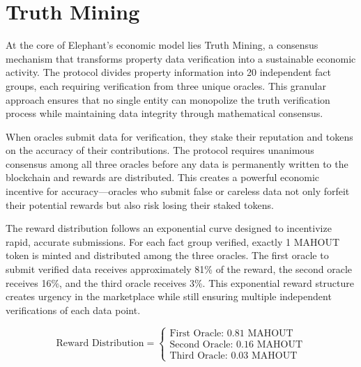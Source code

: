 \section{Truth Mining}

At the core of Elephant's economic model lies Truth Mining, a consensus mechanism that transforms property data verification into a sustainable economic activity. The protocol divides property information into 20 independent fact groups, each requiring verification from three unique oracles. This granular approach ensures that no single entity can monopolize the truth verification process while maintaining data integrity through mathematical consensus.

When oracles submit data for verification, they stake their reputation and tokens on the accuracy of their contributions. The protocol requires unanimous consensus among all three oracles before any data is permanently written to the blockchain and rewards are distributed. This creates a powerful economic incentive for accuracy—oracles who submit false or careless data not only forfeit their potential rewards but also risk losing their staked tokens.

The reward distribution follows an exponential curve designed to incentivize rapid, accurate submissions. For each fact group verified, exactly 1 MAHOUT token is minted and distributed among the three oracles. The first oracle to submit verified data receives approximately 81\% of the reward, the second oracle receives 16\%, and the third oracle receives 3\%. This exponential reward structure creates urgency in the marketplace while still ensuring multiple independent verifications of each data point.

\[
\text{Reward Distribution} = \begin{cases}
\text{First Oracle: } 0.81 \text{ MAHOUT} \\
\text{Second Oracle: } 0.16 \text{ MAHOUT} \\
\text{Third Oracle: } 0.03 \text{ MAHOUT}
\end{cases}
\]

